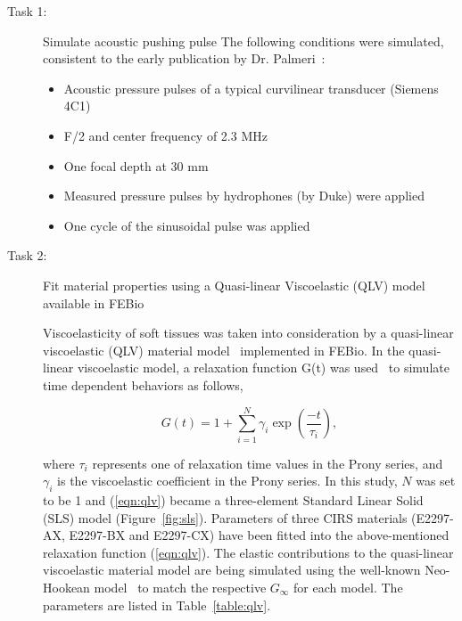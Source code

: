 \begin{description}
    \item[Task 1:] Simulate acoustic pushing pulse
        The following conditions were simulated, consistent to the early
        publication by Dr.  Palmeri~\cite{Palmeri2008}:
        \begin{itemize}
            \item Acoustic pressure pulses of a typical curvilinear transducer (Siemens 4C1)
            \item F/2 and center frequency of 2.3 MHz
            \item One focal depth at 30 mm
            \item Measured pressure pulses by hydrophones (by Duke) were applied
            \item One cycle of the sinusoidal pulse was applied
        \end{itemize}
    \item[Task 2:] Fit material properties using a Quasi-linear Viscoelastic
    (QLV) model available in FEBio~\cite{Mass2012}
        
    Viscoelasticity of soft tissues was taken into consideration by a
    quasi-linear viscoelastic (QLV) material model~\cite{Fung1993a} implemented
    in FEBio.  In the quasi-linear viscoelastic model, a relaxation function
    G(t) was used~\cite{Gerig2003} to simulate time dependent behaviors as
    follows,

    \begin{equation}\label{eqn:qlv}
        G(t) = 1 + \sum\limits_{i=1}^N \gamma_i \exp\left(\frac{-t}{\tau_i}\right),
    \end{equation}

    where $\tau_i$ represents one of relaxation time values in the Prony
    series, and $\gamma_i$ is the viscoelastic coefficient in the Prony series.
    In this study, $N$ was set to be 1 and (\ref{eqn:qlv}) became a
    three-element Standard Linear Solid (SLS) model (Figure~\ref{fig:sls}).
    Parameters of three CIRS materials (E2297-AX, E2297-BX and E2297-CX) have
    been fitted into the above-mentioned relaxation function (\ref{eqn:qlv}).
    The elastic contributions to the quasi-linear viscoelastic material model
    are being simulated using the well-known Neo-Hookean model~\cite{Fung1993a}
    to match the respective $G_\infty$ for each model. The parameters are listed
    in Table~\ref{table:qlv}.


\end{description}
